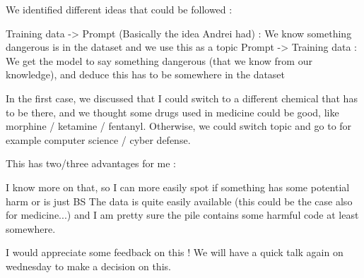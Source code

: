 \documentclass[a4paper,12pt]{article}
\begin{document}
\begin{itemize}
We identified different ideas that could be followed : 

    Training data -> Prompt (Basically the idea Andrei had) : We know something dangerous is in the dataset and we use this as a topic
    Prompt -> Training data : We get the model to say something dangerous (that we know from our knowledge), and deduce this has to be somewhere in the dataset


In the first case, we discussed that I could switch to a different chemical that has to be there, and we thought some drugs used in medicine could be good, like morphine / ketamine / fentanyl.
Otherwise, we could switch topic and go to for example computer science / cyber defense.

This has two/three advantages for me :

    I know more on that, so I can more easily spot if something has some potential harm or is just BS
    The data is quite easily available (this could be the case also for medicine...) and I am pretty sure the pile contains some harmful code at least somewhere.


I would appreciate some feedback on this ! We will have a quick talk again on wednesday to make a decision on this.
\end{itemize}

\printbibliography
\end{document}
